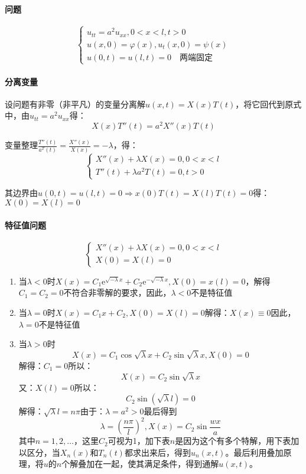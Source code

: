 \paragraph{问题}
\[\begin{cases}
u_{tt}=a^2u_{xx},0<x<l,t>0\\
u(x,0)=\varphi(x),u_t(x,0)=\psi(x)\\
u(0,t)=u(l,t)=0\quad\text{两端固定}
\end{cases}\]

\paragraph{分离变量}设问题有非零（非平凡）的变量分离解\(u(x,t)=X(x)T(t)\)，将它回代到原式中，由\(u_{tt}=a^2u_{xx}\)得：
\[
X(x)T''(t)=a^2X''(x)T(t)
\]

变量整理\(\frac{T''(t)}{a^T(t)}=\frac{X''(x)}{X(x)}=-\lambda\)，得：
\[\begin{cases}
X''(x)+\lambda X(x)=0,0<x<l\\
T''(t)+\lambda a^2T(t)=0,t>0
\end{cases}\]

其边界由\(u(0,t)=u(l,t)=0\Rightarrow x(0)T(t)=X(l)T(t)=0\)得：\(X(0)=X(l)=0\)

\paragraph{特征值问题}
\[\begin{cases}
X''(x)+\lambda X(x)=0,0<x<l\\X(0)=X(l)=0
\end{cases}\]
\begin{enumerate}
    \item 当\(\lambda<0\)时\(X(x)=C_1\mathrm{e}^{\sqrt{-\lambda}x}+C_2\mathrm{e}^{-\sqrt{-\lambda}x},X(0)=x(l)=0\)，解得\(C_1=C_2=0\)不符合非零解的要求，因此，\(\lambda<0\)不是特征值
    \item 当\(\lambda=0\)时\(X(x)=C_1x+C_2,X(0)=X(l)=0\)解得：\(X(x)\equiv0\)因此，\(\lambda=0\)不是特征值
    \item 当\(\lambda>0\)时\[X(x)=C_1\cos{\sqrt\lambda x}+C_2\sin{\sqrt\lambda x},X(0)=0\]
    解得：\(C_1=0\)所以：
    \[X(x)=C_2\sin{\sqrt\lambda x}\]
    又：\(X(l)=0\)所以：
    \[C_2\sin{(\sqrt\lambda l)}=0\]
    解得：\(\sqrt\lambda l=n\pi\)由于：\(\lambda=a^2>0\)最后得到
    \[\lambda=\left(\frac{n\pi}{l}\right)^2,X(x)=C_2\sin\frac{wx}{a}\]
    其中\(n=1,2,\ldots\)，这里\(C_2\)可视为1，加下表\(n\)是因为这个有多个特解，用下表加以区分，当\(X_n(x)\)和\(T_n(t)\)都求出来后，得到\(u_n(x,t)\)。最后利用叠加原理，将\(u\)的\(n\)个解叠加在一起，使其满足条件，得到通解\(u(x,t)\)。
\end{enumerate}

